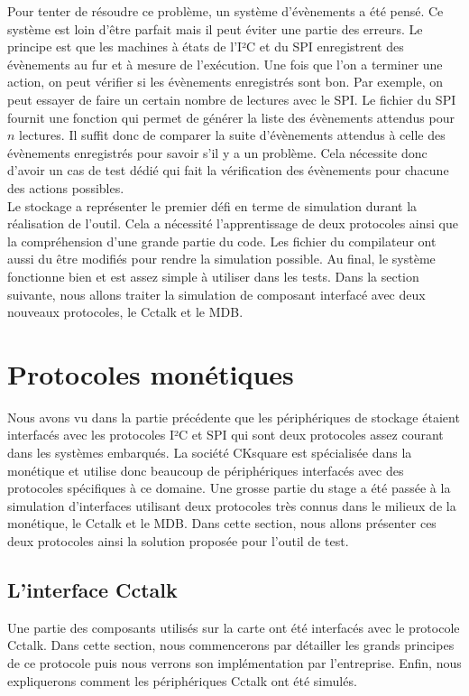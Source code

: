 \documentclass[a4paper]{article}
\begin{document}
Pour tenter de résoudre ce problème, un système d'évènements a été pensé. Ce
système est loin d'être parfait mais il peut éviter une partie des erreurs. Le
principe est que les machines à états de l'I²C et du SPI enregistrent des
évènements au fur et à mesure de l'exécution. Une fois que l'on a terminer une
action, on peut vérifier si les évènements enregistrés sont bon. Par exemple, on
peut essayer de faire un certain nombre de lectures avec le SPI. Le fichier du
SPI fournit une fonction qui permet de générer la liste des évènements attendus
pour $n$ lectures. Il suffit donc de comparer la suite d'évènements attendus à
celle des évènements enregistrés pour savoir s'il y a un problème. Cela
nécessite donc d'avoir un cas de test dédié qui fait la vérification des
évènements pour chacune des actions possibles.
\\
Le stockage a représenter le premier défi en terme de simulation durant la
réalisation de l'outil. Cela a nécessité l'apprentissage de deux protocoles
ainsi que la compréhension d'une grande partie du code. Les fichier du
compilateur ont aussi du être modifiés pour rendre la simulation possible. Au
final, le système fonctionne bien et est assez simple à utiliser dans les tests.
Dans la section suivante, nous allons traiter la simulation de composant
interfacé avec deux nouveaux protocoles, le Cctalk et le MDB.
\section{Protocoles monétiques}%

Nous avons vu dans la partie précédente que les périphériques de stockage
étaient interfacés avec les protocoles I²C et SPI qui sont deux protocoles assez
courant dans les systèmes embarqués. La société CKsquare est spécialisée dans la
monétique et utilise donc beaucoup de périphériques interfacés avec des
protocoles spécifiques à ce domaine. Une grosse partie du stage a été passée à
la simulation d'interfaces utilisant deux protocoles très connus dans le milieux
de la monétique, le Cctalk et le MDB. Dans cette section, nous allons présenter
ces deux protocoles ainsi la solution proposée pour l'outil de test.

\subsection{L'interface Cctalk}%
\label{interfacecctalk}

Une partie des composants utilisés sur la carte ont été interfacés avec le
protocole Cctalk. Dans cette section, nous commencerons par détailler les grands
principes de ce protocole puis nous verrons son implémentation par l'entreprise.
Enfin, nous expliquerons comment les périphériques Cctalk ont été simulés.
\end{document}

